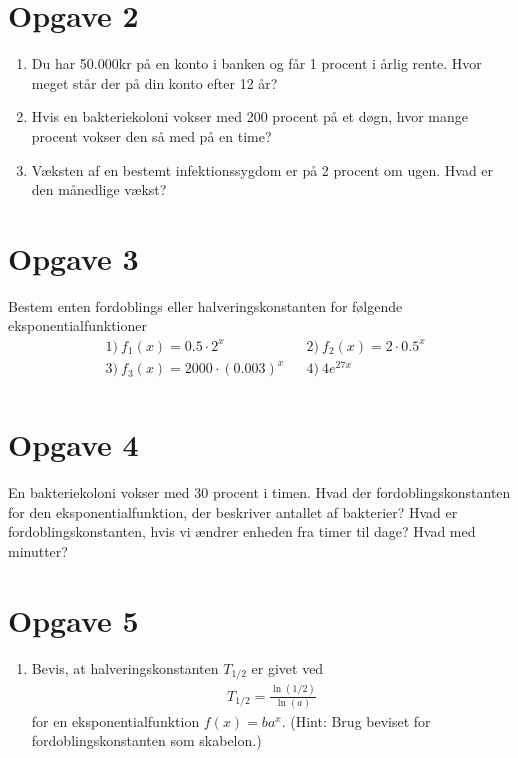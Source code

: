 \documentclass[12pt]{article}
\begin{document}
\section*{Opgave 2}
\begin{enumerate}[label=\roman*)]
\item Du har 50.000kr på en konto i banken og får 1 procent i årlig rente. Hvor meget står der på din konto efter 12 år?
\item Hvis en bakteriekoloni vokser med 200 procent på et døgn, hvor mange procent vokser den så med på en time?
\item Væksten af en bestemt infektionssygdom er på 2 procent om ugen. Hvad er den månedlige vækst?
\end{enumerate}
\section*{Opgave 3}
Bestem enten fordoblings eller halveringskonstanten for følgende eksponentialfunktioner
\begin{align*}
&1) \ f_1(x) = 0.5\cdot 2^x   &&2) \ f_2(x)=2\cdot 0.5^x  \\
&3) \ f_3(x) = 2000\cdot(0.003)^x  &&4) \ 4e^{27x}  \\
\end{align*}
\section*{Opgave 4}
En bakteriekoloni vokser med $30$ procent i timen. Hvad der fordoblingskonstanten for den eksponentialfunktion, der beskriver antallet af bakterier? Hvad er fordoblingskonstanten, hvis vi ændrer enheden fra timer til dage? Hvad med minutter?

\section*{Opgave 5}
\begin{enumerate}[label=\roman*)]
\item Bevis, at halveringskonstanten $T_{1/2}$ er givet ved 
\begin{align*}
T_{1/2} = \frac{\ln(1/2)}{\ln(a)}
\end{align*}
for en eksponentialfunktion $f(x) = ba^x$. (Hint: Brug beviset for fordoblingskonstanten som skabelon.)
\end{enumerate}
\end{document}
